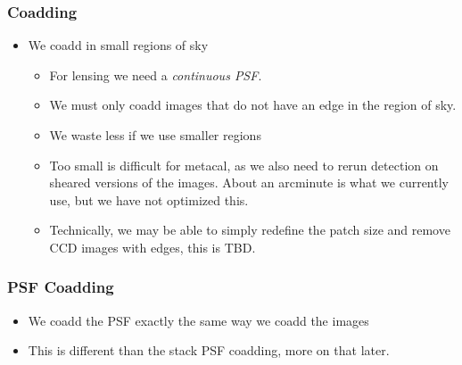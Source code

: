 \documentclass{beamer}
\begin{document}
\frame
{

    \frametitle{Coadding}


    \begin{itemize}

        \item We coadd in small regions of sky
            \begin{itemize}
                \item For lensing we need a {\em continuous PSF}.
                \item We must only coadd images that do not have an edge in the region of sky.
                \item We waste less if we use smaller regions

                \item Too small is difficult for metacal, as we also need to
                    rerun detection on sheared versions of the images. About an
                    arcminute is what we currently use, but we have not
                    optimized this.

                \item Technically, we may be able to simply redefine the patch size and remove CCD images
                  with edges, this is TBD.

            \end{itemize}

    \end{itemize}

}

\frame
{

    \frametitle{PSF Coadding}

    \begin{itemize}
        \item We coadd the PSF exactly the same way we coadd the images

        \item This is different than the stack PSF coadding, more on that later.
    \end{itemize}

}
\end{document}
